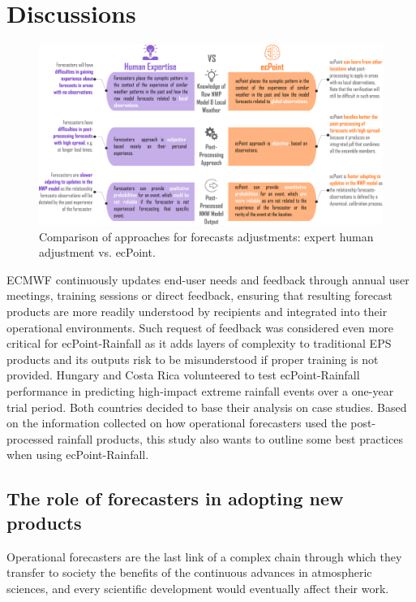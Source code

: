 \documentclass[twocol]{ametsocV5} %
\begin{document}
\section{Discussions}

\begin{figure}
\centerline{\includegraphics[width=39pc]{manuscript/Figures/Fig9.png}}
\caption{Comparison of approaches for forecasts adjustments: expert human adjustment vs. ecPoint.}
\label{Fig.9}
\end{figure}


ECMWF continuously updates end-user needs and feedback through annual user meetings, training sessions or direct feedback, ensuring that resulting forecast products are more readily understood by recipients and integrated into their operational environments. Such request of feedback was considered even more critical for ecPoint-Rainfall as it adds layers of complexity to traditional EPS products and its outputs risk to be misunderstood if proper training is not provided. Hungary and Costa Rica volunteered to test ecPoint-Rainfall performance in predicting high-impact extreme rainfall events over a one-year trial period. Both countries decided to base their analysis on case studies. Based on the information collected on how operational forecasters used the post-processed rainfall products, this study also wants to outline some best practices when using ecPoint-Rainfall.  


\subsection{The role of forecasters in adopting new products}
Operational forecasters are the last link of a complex chain through which they transfer to society the benefits of the continuous advances in atmospheric sciences, and every scientific development would eventually affect their work.
\end{document}
